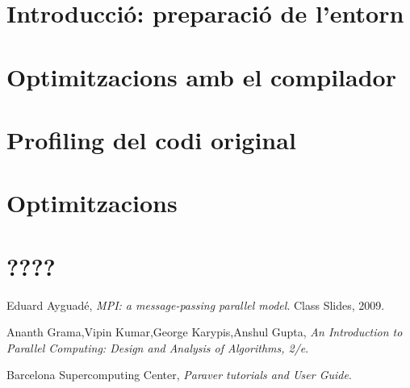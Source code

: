 \documentclass[final,a4paper,11pt]{report}
\begin{document}


\tableofcontents
\newpage


\section{Introducció: preparació de l'entorn}

\section{Optimitzacions amb el compilador}

\section{Profiling del codi original}


\section{Optimitzacions}


\section{????}

\begin{thebibliography}{9}

  Eduard Ayguadé,
  \emph{MPI: a message-passing parallel model}.
  Class Slides,
  2009.

  Ananth Grama,Vipin Kumar,George Karypis,Anshul Gupta,
  \emph{An Introduction to Parallel Computing: Design and Analysis of Algorithms, 2/e}.

  Barcelona Supercomputing Center,
  \emph{Paraver tutorials and User Guide}.

\end{thebibliography}
\end{document}
